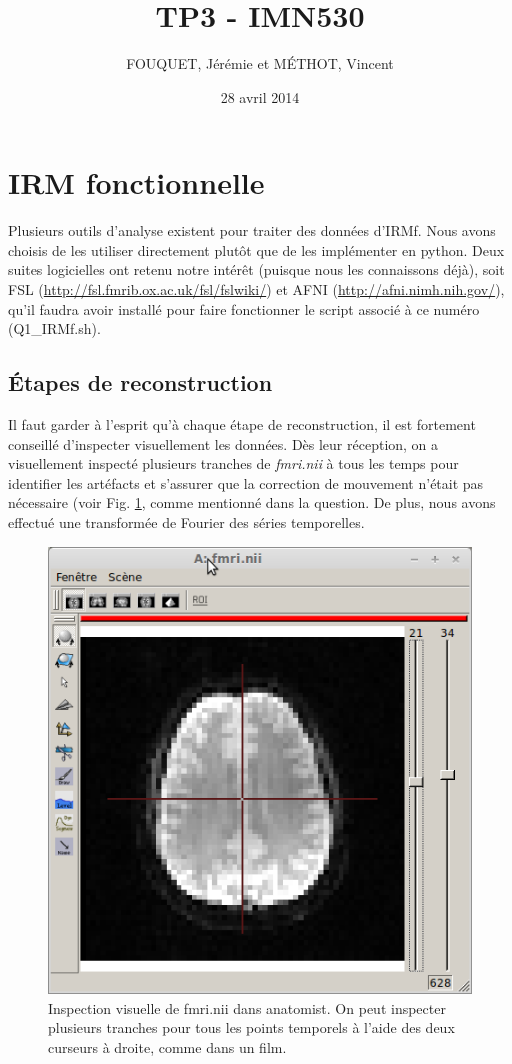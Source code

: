 \documentclass[a4paper]{article}
\title{TP3 - IMN530}
\author{FOUQUET, Jérémie et MÉTHOT, Vincent}
\date{28 avril 2014}
\begin{document}
\maketitle

\section{IRM fonctionnelle}

Plusieurs outils d'analyse existent pour traiter des données d'IRMf. Nous avons choisis de les utiliser directement plutôt que de les implémenter en python. Deux suites logicielles ont retenu notre intérêt (puisque nous les connaissons déjà), soit FSL (\url{http://fsl.fmrib.ox.ac.uk/fsl/fslwiki/}) et AFNI (\url{http://afni.nimh.nih.gov/}), qu'il faudra avoir installé pour faire fonctionner le script associé à ce numéro (Q1\_IRMf.sh).

\subsection{Étapes de reconstruction}

Il faut garder à l'esprit qu'à chaque étape de reconstruction, il est fortement conseillé d'inspecter visuellement les données. Dès leur réception, on a visuellement inspecté plusieurs tranches de \emph{fmri.nii} à tous les temps pour identifier les artéfacts et s'assurer que la correction de mouvement n'était pas nécessaire (voir Fig. \ref{fmri_anatomist}, comme mentionné dans la question. De plus, nous avons effectué une transformée de Fourier des séries temporelles.

\begin{figure}[h!]
   \caption{\label{fmri_anatomist} Inspection visuelle de fmri.nii dans anatomist. On peut inspecter plusieurs tranches pour tous les points temporels à l'aide des deux curseurs à droite, comme dans un film.}
   \centering
   \includegraphics[width=\textwidth]{fmri_anatomist}
\end{figure}
\end{document}
